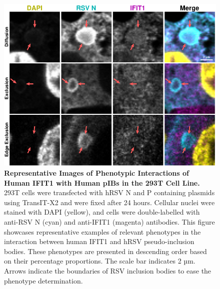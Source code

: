\begin{figure}
    \centering
    \includegraphics[width=1\linewidth]{09. Chapter 4/Figs/01. pIB/02. IFIT1/03. i1-293t-hnhp.pdf}
    \caption[Representative Images of Phenotypic Interactions of Human IFIT1 with Human pIBs in the 293T Cell Line.]{\textbf{Representative Images of Phenotypic Interactions of Human IFIT1 with Human pIBs in the 293T Cell Line.} 293T cells were transfected with hRSV N and P containing plasmids using TransIT-X2 and were fixed after 24 hours. Cellular nuclei were stained with DAPI (yellow), and cells were double-labelled with anti-RSV N (cyan) and anti-IFIT1 (magenta) antibodies. This figure showcases representative examples of relevant phenotypes in the interaction between human IFIT1 and hRSV pseudo-inclusion bodies. These phenotypes are presented in descending order based on their percentage proportions. The scale bar indicates 2 µm. Arrows indicate the boundaries of RSV inclusion bodies to ease the phenotype determination.}
    \label{fig:Representative Images of Phenotypic Interactions of Human IFIT1 with Human pIBs in the 293T Cell Line}
\end{figure}

